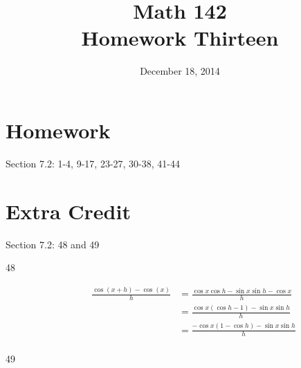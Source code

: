\documentclass{exam}
\author{}
\date{December 18, 2014}
\title{Math 142 \\ Homework Thirteen}
\newcommand{\dg}{\ensuremath{^\circ}}
\begin{document}
  \maketitle

  \section{Homework}
  Section 7.2: 1-4, 9-17, 23-27, 30-38, 41-44

  \section{Extra Credit}
  Section 7.2: 48 and 49

  \ifprintanswers
    \pagebreak
    \begin{description}

      \item[48]
        \begin{align*}
          \frac{\cos(x + h) - \cos(x)}{h} & = \frac{\cos x \cos h - \sin x \sin h - \cos x}{h} \\
                                          & = \frac{\cos x (\cos h - 1) - \sin x \sin h}{h} \\
                                          & = \frac{- \cos x (1 - \cos h) - \sin x \sin h}{h} \\
        \end{align*}

      \item[49]
\end{description}
\end{document}
